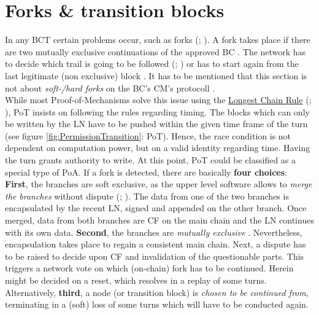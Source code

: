 \FloatBarrier

\section{Forks \& transition blocks}
\label{sec:TransitionBlocks}

In any \gls{BCT} certain problems occur, such as forks (\citet[60]{Butijn.2020}; \citet[54]{Dib.2018}).
A fork takes place if there are two mutually exclusive continuations of the approved \gls{BC} \cite[22]{Yuen.2019}.
The network has to decide which trail is going to be followed (\citet{Courtois.2014}; \citet{Ewerhart.2020}) or has to start again from the last legitimate (non exclusive) block \cite[3-4]{FinlowBatesK..2017}.
It has to be mentioned that this section is not about \textit{soft-/hard forks}
on the \gls{BC}'s \gls{CM}'s protocoll \cite[4-5]{FinlowBatesK..2017}. \\
While most Proof-of-Mechanisms solve this issue using the \hyperref[LongestChainRule]{Longest Chain Rule} (\citet{Courtois.2014}; \cite{Nakamoto.2009}),
\gls{PoT} insists on following the rules regarding timing.
The blocks which can only be written by the \gls{LN} have to be pushed within the given time frame of the turn (see figure \ref{fig:PermissionTransition}: PoT).
Hence, the race condition is not dependent on computation power, but on a valid identity regarding time.
Having the turn grants authority to write.
At this point, \gls{PoT} could be classified as a special type of \gls{PoA}.
If a fork is detected, there are basically \textbf{four choices}: \\
\textbf{First}, the branches are soft exclusive, as the upper level software
allows to \textit{merge the branches} without dispute (\citet[7-8]{RanchalPedrosa.2020}; \citet[4-5]{Wang.2018}).
The data from one of the two branches is encapsulated by the recent \gls{LN}, signed and appended on the other branch.
Once merged, data from both branches are \gls{CF} on the main chain and the \gls{LN} continues with its own data.
\textbf{Second}, the branches are \textit{mutually exclusive} .
Nevertheless, encapsulation takes place to regain a consistent main chain.
Next, a dispute has to be raised to decide upon \gls{CF} and invalidation of the questionable parts.
This triggers a network vote on which (on-chain) fork has to be continued.
Herein might be decided on a reset, which resolves in a replay of some turns.
Alternatively, \textbf{third}, a node (or transition block) is \textit{chosen to be continued from},
terminating in a (soft) loss of some turns which will have to be conducted again.
